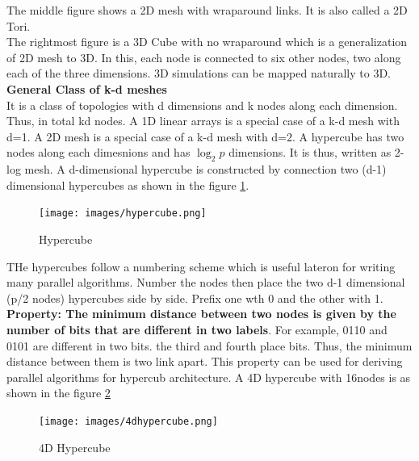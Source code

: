 \documentclass[12pt]{article}
\begin{document}
The middle figure shows a 2D mesh with wraparound links. It is also called a 2D Tori.\\
The rightmost figure is a 3D Cube with no wraparound which is a generalization of 2D mesh to 3D. In this, each node is connected to six other nodes, 
two along each of the three dimensions. 3D simulations can be mapped naturally to 3D.\\
\textbf{General Class of k-d meshes}\\
It is a class of topologies with d dimensions and k nodes along each dimension. Thus, in total kd nodes.
A 1D linear arrays is a special case of a k-d mesh with d=1. A 2D mesh is a special case of a k-d mesh with d=2.
A hypercube has two nodes along each dimesnions and has $\log_2 p$ dimensions. It is thus, written as 2-log mesh.
A d-dimensional hypercube is constructed by connection two (d-1) dimensional hypercubes as shown in the figure \ref{fig:hypercube}.
\begin{figure}[H]
    \centering
    \texttt{[image: images/hypercube.png]}
    \caption{Hypercube}
    \label{fig:hypercube}
\end{figure}
THe hypercubes follow a numbering scheme which is useful lateron for writing many parallel algorithms. 
Number the nodes then place the two d-1 dimensional (p/2 nodes) hypercubes side by side. Prefix one wth 0 and the other with 1.
\textbf{Property: The minimum distance between two nodes is given by the number of bits that are different in two labels}. For example,
0110 and 0101 are different in two bits. the third and fourth place bits. Thus, the minimum distance between them is two link apart. This property can 
be used for deriving parallel algorithms for hypercub architecture.
A 4D hypercube with 16nodes is as shown in the figure \ref{fig:4dhypercube}
\begin{figure}[H]
    \centering
    \texttt{[image: images/4dhypercube.png]}
    \caption{4D Hypercube}
    \label{fig:4dhypercube}
\end{figure}
\end{document}
